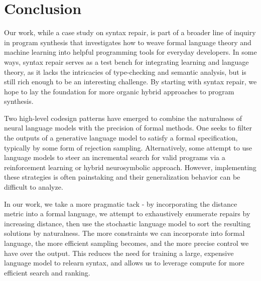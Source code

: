 \documentclass[sigplan,review,acmsmall,nonacm,screen,anonymous]{acmart}\settopmatter{printfolios=false,printccs=false,printacmref=false}
\begin{document}
\clearpage\section{Conclusion}\label{sec:conclusion}

Our work, while a case study on syntax repair, is part of a broader line of inquiry in program synthesis that investigates how to weave formal language theory and machine learning into helpful programming tools for everyday developers. In some ways, syntax repair serves as a test bench for integrating learning and language theory, as it lacks the intricacies of type-checking and semantic analysis, but is still rich enough to be an interesting challenge. By starting with syntax repair, we hope to lay the foundation for more organic hybrid approaches to program synthesis.

Two high-level codesign patterns have emerged to combine the naturalness of neural language models with the precision of formal methods. One seeks to filter the outputs of a generative language model to satisfy a formal specification, typically by some form of rejection sampling. Alternatively, some attempt to use language models to steer an incremental search for valid programs via a reinforcement learning or hybrid neurosymbolic approach. However, implementing these strategies is often painstaking and their generalization behavior can be difficult to analyze.

In our work, we take a more pragmatic tack - by incorporating the distance metric into a formal language, we attempt to exhaustively enumerate repairs by increasing distance, then use the stochastic language model to sort the resulting solutions by naturalness. The more constraints we can incorporate into formal language, the more efficient sampling becomes, and the more precise control we have over the output. This reduces the need for training a large, expensive language model to relearn syntax, and allows us to leverage compute for more efficient search and ranking.

\end{document}
